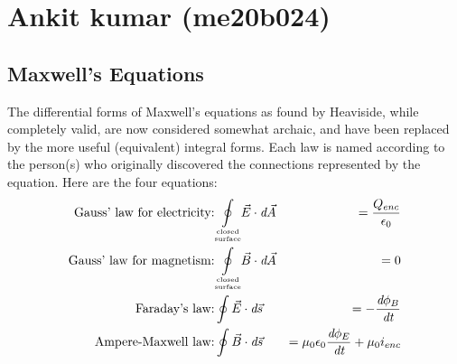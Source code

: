 

%

\section{Ankit kumar (me20b024)}


\def\eps0{\ensuremath{\epsilon _0}}
\def\muz{\ensuremath{\mu_0}}

\def\cint#1{\ensuremath{\displaystyle\underset{\substack{\text{\tiny{closed}}\\\text{\tiny{surface}}}}{\oint} \mspace{-0.1 mu} #1}}

\def\phie{\ensuremath{\phi_E}}
\def\phib{\ensuremath{\phi_B}}

\def\dA{\ensuremath{\emph{d}\vec{A}}}
\def\dB{\ensuremath{\emph{d}\vec{B}}}
\def\ds{\ensuremath{\emph{d}\vec{s}}}
\def\dt{\ensuremath{\emph{dt}}}
\def\dphie{\ensuremath{\emph{d}\phie}}
\def\dphib{\ensuremath{\emph{d}\phib}}






\subsection{Maxwell's Equations}

\indent The differential forms of Maxwell's equations as found by Heaviside, while completely valid, are now considered somewhat archaic, and have been replaced by the more useful (equivalent) integral forms. Each law is named according to the person(s) who originally discovered the connections represented by the equation. Here are the four equations:
\begin{eqnarray}
\label{eq:gauss_ele}
\text{Gauss' law for electricity:}& \displaystyle \cint{\vec{E}\cdot\dA}&=\frac{Q_{enc}}{\eps0}\\
\label{eq:gauss_mag}
\text{Gauss' law for magnetism:}& \displaystyle \cint{\vec{B}\cdot\dA}&=0\\
\label{eq:faraday}
\text{Faraday's law:}& \displaystyle\oint{\vec{E}\cdot\ds}&=-\frac{\dphib}{\dt}\\
\label{eq:ampere}
\text{Ampere-Maxwell law:}& \displaystyle\oint{\vec{B}\cdot\ds}&=\muz\eps0\frac{\dphie}{\dt}+\muz i_{enc}
\end{eqnarray}



